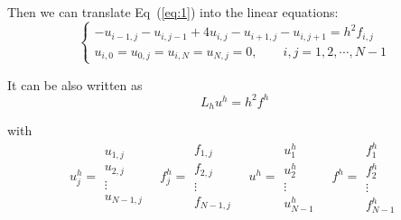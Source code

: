 \documentclass[a4paper,11pt]{article}
\begin{document}
Then we can translate Eq~(\ref{eq:1}) into the linear equations:
\begin{equation}
    \begin{cases}
        -u_{i-1,j}-u_{i,j-1}+4u_{i,j}-u_{i+1,j}-u_{i,j+1}=h^2f_{i,j} \\
        u_{i,0}=u_{0,j}=u_{i,N}=u_{N,j}=0, \quad \quad i,j=1,2,\dotsb,N-1
    \end{cases}
\end{equation}

It can be also written as 
\begin{equation}\label{eq:5}
    L_{h}u^{h}=h^2f^{h}
\end{equation}

with
\begin{equation}
    u_{j}^{h}=
        \begin{array}{|c|}
            u_{1,j}\\
            u_{2,j}\\
            \vdots\\
            u_{N-1,j}
        \end{array}
    \quad
    f_{j}^{h}=
        \begin{array}{|c|}
            f_{1,j}\\
            f_{2,j}\\
            \vdots\\
            f_{N-1,j}
        \end{array}
    \quad
    u^{h}=
        \begin{array}{|c|}
            u^{h}_{1}\\
            u^{h}_{2}\\
            \vdots\\
            u^{h}_{N-1}
        \end{array}
    \quad
    f^{h}=
        \begin{array}{|c|}
            f^{h}_{1}\\
            f^{h}_{2}\\
            \vdots\\
            f^{h}_{N-1}
        \end{array}
    \nonumber
\end{equation}
\end{document}
